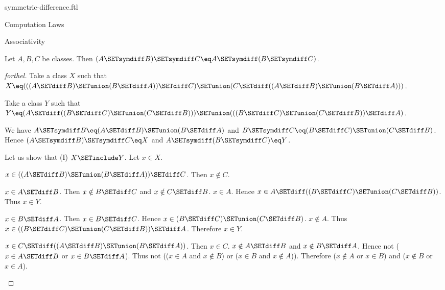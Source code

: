 \documentclass{naproche-library}
\begin{document}
\begin{smodule}[title=Symmetric Difference]{symmetric-difference.ftl}
\begin{sfragment}{Computation Laws}
  \begin{sfragment}{Associativity}
    \begin{proposition}[forthel,id=FOUNDATIONS_03_8680845204258816]
      Let $A, B, C$ be classes.
      Then $(A \SETsymdiff B) \SETsymdiff C \eq A \SETsymdiff (B \SETsymdiff C)$.
    \end{proposition}
    \begin{proof}[forthel]
      Take a class $X$ such that $X \eq (((A \SETdiff B) \SETunion (B \SETdiff A)) \SETdiff C) \SETunion (C \SETdiff ((A \SETdiff B) \SETunion (B \SETdiff A)))$.

      Take a class $Y$ such that $Y \eq (A \SETdiff ((B \SETdiff C) \SETunion (C \SETdiff B))) \SETunion (((B \SETdiff C) \SETunion (C \SETdiff B)) \SETdiff A)$.

      We have $A \SETsymdiff B \eq (A \SETdiff B) \SETunion (B \SETdiff A)$ and $B \SETsymdiff C \eq (B \SETdiff C) \SETunion (C \SETdiff B)$.
      Hence $(A \SETsymdiff B) \SETsymdiff C \eq X$ and $A \SETsymdiff (B \SETsymdiff C) \eq Y$.

      Let us show that (I) $X \SETinclude Y$.
        Let $x \in X$.

        \begin{case}{$x \in ((A \SETdiff B) \SETunion (B \SETdiff A)) \SETdiff C$.}
          Then $x \notin C$.

          \begin{case}{$x \in A \SETdiff B$.}
            Then $x \notin B \SETdiff C$ and $x \notin C \SETdiff B$. $x \in A$.
            Hence $x \in A \SETdiff ((B \SETdiff C) \SETunion (C \SETdiff B))$.
            Thus $x \in Y$.
          \end{case}

          \begin{case}{$x \in B \SETdiff A$.}
            Then $x \in B \SETdiff C$.
            Hence $x \in (B \SETdiff C) \SETunion (C \SETdiff B)$. $x \notin A$.
            Thus $x \in ((B \SETdiff C) \SETunion (C \SETdiff B)) \SETdiff A$.
            Therefore $x \in Y$.
          \end{case}
        \end{case}

        \begin{case}{$x \in C \SETdiff ((A \SETdiff B) \SETunion (B \SETdiff A))$.}
          Then $x \in C$.
          $x \notin A \SETdiff B$ and $x \notin B \SETdiff A$.
          Hence not ($x \in A \SETdiff B$ or $x \in B \SETdiff A$).
          Thus not (($x \in A$ and $x \notin B$) or ($x \in B$ and $x \notin A$)).
          Therefore ($x \notin A$ or $x \in B$) and ($x \notin B$ or $x \in A$).


\end{case}
\end{proof}
\end{sfragment}
\end{sfragment}
\end{smodule}
\end{document}
